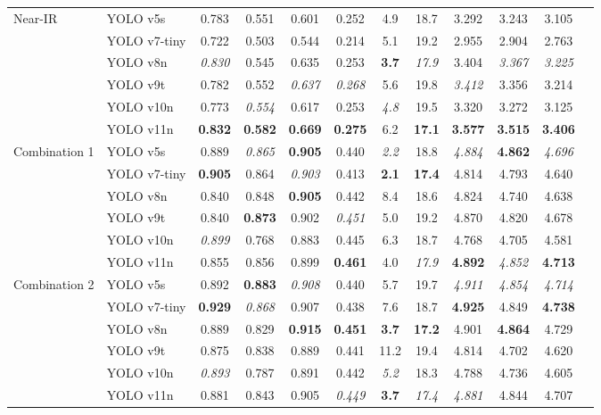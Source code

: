 \documentclass[runningheads]{llncs}
\begin{document}
\begin{table}[h!]
\begin{tabular}{@{}llcccccccccc@{}}
\multirow{}{}{Near-IR}
& YOLO v5s 
& 0.783 & 0.551 & 0.601 & 0.252 
& 4.9 & 18.7 
& 3.292 & 3.243 & 3.105 \\
& YOLO v7-tiny 
& 0.722 & 0.503 & 0.544 & 0.214 
& 5.1 & 19.2 
& 2.955 & 2.904 & 2.763 \\
& YOLO v8n 
& \textit{0.830} & 0.545 & 0.635 & 0.253 
& \textbf{3.7} & \textit{17.9} 
& 3.404 & \textit{3.367} & \textit{3.225} \\
& YOLO v9t 
& 0.782 & 0.552 & \textit{0.637} & \textit{0.268} 
& 5.6 & 19.8 
& \textit{3.412} & 3.356 & 3.214 \\
& YOLO v10n 
& 0.773 & \textit{0.554} & 0.617 & 0.253 
& \textit{4.8} & 19.5 
& 3.320 & 3.272 & 3.125 \\
& YOLO v11n 
& \textbf{0.832} & \textbf{0.582} & \textbf{0.669} & \textbf{0.275} 
& 6.2 & \textbf{17.1} 
& \textbf{3.577} & \textbf{3.515} & \textbf{3.406} \\
\midrule


\multirow{}{}{Combination 1}
& YOLO v5s 
& 0.889 & \textit{0.865} & \textbf{0.905} & 0.440 
& \textit{2.2} & 18.8 
& \textit{4.884} & \textbf{4.862} & \textit{4.696} \\
& YOLO v7-tiny 
& \textbf{0.905} & 0.864 & \textit{0.903} & 0.413 
& \textbf{2.1} & \textbf{17.4} 
& 4.814 & 4.793 & 4.640 \\
& YOLO v8n 
& 0.840 & 0.848 & \textbf{0.905} & 0.442 
& 8.4 & 18.6 
& 4.824 & 4.740 & 4.638 \\
& YOLO v9t 
& 0.840 & \textbf{0.873} & 0.902 & \textit{0.451} 
& 5.0 & 19.2 
& 4.870 & 4.820 & 4.678 \\
& YOLO v10n 
& \textit{0.899} & 0.768 & 0.883 & 0.445 
& 6.3 & 18.7 
& 4.768 & 4.705 & 4.581 \\
& YOLO v11n 
& 0.855 & 0.856 & 0.899 & \textbf{0.461} 
& 4.0 & \textit{17.9} 
& \textbf{4.892} & \textit{4.852} & \textbf{4.713} \\

\midrule
\multirow{}{}{Combination 2}
& YOLO v5s 
& 0.892 & \textbf{0.883} & \textit{0.908} & 0.440 
& 5.7 & 19.7 
& \textit{4.911} & \textit{4.854} & \textit{4.714} \\
& YOLO v7-tiny 
& \textbf{0.929} & \textit{0.868} & 0.907 & 0.438 
& 7.6 & 18.7 
& \textbf{4.925} & 4.849 & \textbf{4.738} \\
& YOLO v8n 
& 0.889 & 0.829 & \textbf{0.915} & \textbf{0.451} 
& \textbf{3.7} & \textbf{17.2} 
& 4.901 & \textbf{4.864} & 4.729 \\
& YOLO v9t 
& 0.875 & 0.838 & 0.889 & 0.441 
& 11.2 & 19.4 
& 4.814 & 4.702 & 4.620 \\
& YOLO v10n 
& \textit{0.893} & 0.787 & 0.891 & 0.442 
& \textit{5.2} & 18.3 
& 4.788 & 4.736 & 4.605 \\
& YOLO v11n 
& 0.881 & 0.843 & 0.905 & \textit{0.449} 
& \textbf{3.7} & \textit{17.4} 
& \textit{4.881} & 4.844 & 4.707 \\



\end{tabular}
\end{table}
\end{document}
